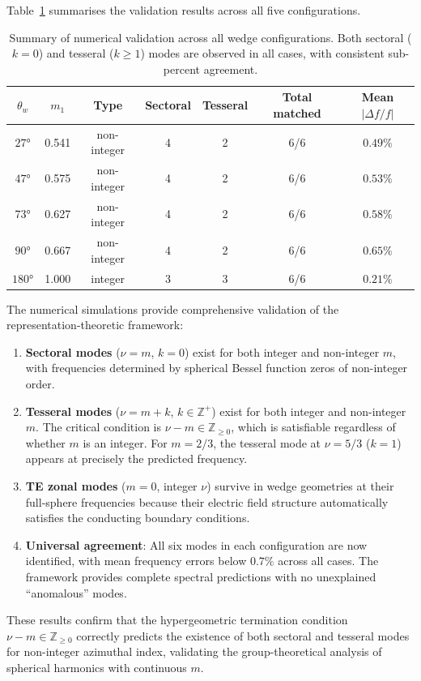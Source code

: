 \documentclass[
  aip,
  amsmath,amssymb,
  preprint
]{revtex4-1}
\begin{document}
Table~\ref{tab:summary} summarises the validation results across all five configurations.
\begin{table}[htbp]
\centering
\caption{Summary of numerical validation across all wedge configurations. Both sectoral ($k=0$) and tesseral ($k \geq 1$) modes are observed in all cases, with consistent sub-percent agreement.}
\label{tab:summary}
\begin{tabular}{ccccccc}
\hline
$\theta_w$ & $m_1$ & Type & Sectoral & Tesseral & Total matched & Mean $|\Delta f/f|$ \\
\hline
$27°$ & 0.541 & non-integer & 4 & 2 & 6/6 & $0.49\%$ \\
$47°$ & 0.575 & non-integer & 4 & 2 & 6/6 & $0.53\%$ \\
$73°$ & 0.627 & non-integer & 4 & 2 & 6/6 & $0.58\%$ \\
$90°$ & 0.667 & non-integer & 4 & 2 & 6/6 & $0.65\%$ \\
$180°$ & 1.000 & integer & 3 & 3 & 6/6 & $0.21\%$ \\
\hline
\end{tabular}
\end{table}
The numerical simulations provide comprehensive validation of the representation-theoretic framework:
\begin{enumerate}
\item \textbf{Sectoral modes} ($\nu = m$, $k = 0$) exist for both integer and non-integer $m$, with frequencies determined by spherical Bessel function zeros of non-integer order.

\item \textbf{Tesseral modes} ($\nu = m + k$, $k \in \mathbb{Z}^+$) exist for both integer and non-integer $m$. The critical condition is $\nu - m \in \mathbb{Z}_{\geq 0}$, which is satisfiable regardless of whether $m$ is an integer. For $m = 2/3$, the tesseral mode at $\nu = 5/3$ ($k = 1$) appears at precisely the predicted frequency.

\item \textbf{TE zonal modes} ($m = 0$, integer $\nu$) survive in wedge geometries at their full-sphere frequencies because their electric field structure automatically satisfies the conducting boundary conditions.

\item \textbf{Universal agreement}: All six modes in each configuration are now identified, with mean frequency errors below $0.7\%$ across all cases. The framework provides complete spectral predictions with no unexplained ``anomalous'' modes.
\end{enumerate}
These results confirm that the hypergeometric termination condition $\nu - m \in \mathbb{Z}_{\geq 0}$ correctly predicts the existence of both sectoral and tesseral modes for non-integer azimuthal index, validating the group-theoretical analysis of spherical harmonics with continuous $m$.
\end{document}
